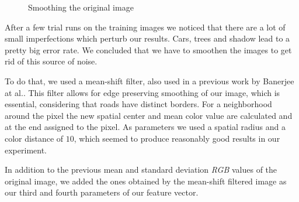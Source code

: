 \documentclass[10pt,conference,compsocconf]{IEEEtran}
\begin{document}
\begin{figure}[t]
	\centering
	\hspace{0.05\linewidth}
	\caption{Smoothing the original image}
\end{figure}

After a few trial runs on the training images we noticed that there are a lot of small imperfections which perturb our results. Cars, trees and shadow lead to a pretty big error rate. We concluded that we have to smoothen the images to get rid of this source of noise.

To do that, we used a mean-shift filter, also used in a previous work by Banerjee at al.\cite{BaBuMo12}. This filter allows for edge preserving smoothing of our image, which is essential, considering that roads have distinct borders. For a neighborhood around the pixel the new spatial center and mean color value are calculated and at the end assigned to the pixel. As parameters we used a spatial radius and a color distance of $10$, which seemed to produce reasonably good results in our experiment.

In addition to the previous mean and standard deviation \emph{RGB} values of the original image, we added the ones obtained by the mean-shift filtered image as our third and fourth parameters of our feature vector. 
\end{document}

